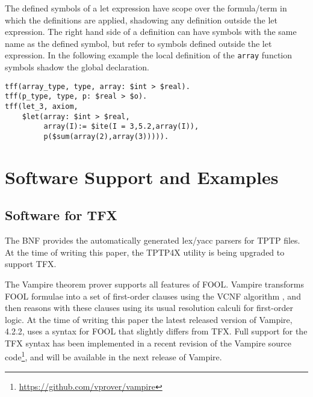 The defined symbols of a let expression have scope over the formula/term in 
which the definitions are applied, shadowing any definition outside the let 
expression. 
The right hand side of a definition can have symbols with the same name as 
the defined symbol, but refer to symbols defined outside the let expression. 
In the following example the local definition of the \lstinline'array' function 
symbols shadow the global declaration.
\begin{lstlisting}[language=tptp]
tff(array_type, type, array: $int > $real).
tff(p_type, type, p: $real > $o).
tff(let_3, axiom,
    $let(array: $int > $real,
         array(I):= $ite(I = 3,5.2,array(I)),
         p($sum(array(2),array(3))))).
\end{lstlisting}


\section{Software Support and Examples}
\label{sec:tfx/ImplementationExamples}

\subsection{Software for TFX}
\label{sec:tfx/Software}
The BNF provides the automatically generated lex/yacc parsers for TPTP files.
At the time of writing this paper, the TPTP4X utility is being upgraded
to support TFX.

The Vampire theorem prover \cite{Vampire13} supports all features of FOOL. 
Vampire transforms FOOL formulae into a set of first-order clauses using the 
VCNF algorithm \cite{FOOLCNF}, and then reasons with these clauses using 
its usual resolution calculi for first-order logic. 
At the time of writing this paper the latest released version of Vampire,
4.2.2, uses a syntax for FOOL that slightly differs from TFX. 
Full support for the TFX syntax has been implemented in a recent revision of 
the Vampire source code\footnote{%
\url{https://github.com/vprover/vampire}}, and will be available
in the next release of Vampire.

